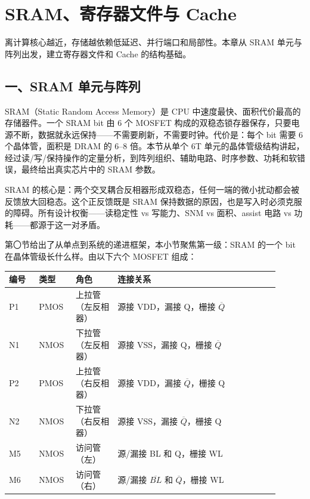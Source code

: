 \chapter{SRAM、寄存器文件与 Cache}

\begin{keyidea}
离计算核心越近，存储越依赖低延迟、并行端口和局部性。本章从 SRAM 单元与阵列出发，建立寄存器文件和 Cache 的结构基础。
\end{keyidea}

\section{一、SRAM 单元与阵列}

SRAM（Static Random Access Memory）是 CPU 中速度最快、面积代价最高的存储器件。一个 SRAM bit 由 6 个 MOSFET 构成的双稳态锁存器保存，只要电源不断，数据就永远保持——不需要刷新，不需要时钟。代价是：每个 bit 需要 6 个晶体管，面积是 DRAM 的 6--8 倍。本节从单个 6T 单元的晶体管级结构讲起，经过读/写/保持操作的定量分析，到阵列组织、辅助电路、时序参数、功耗和软错误，最终给出真实芯片中的 SRAM 参数。

\begin{keyidea}
SRAM 的核心是：两个交叉耦合反相器形成双稳态，任何一端的微小扰动都会被反馈放大回稳态。这个正反馈既是 SRAM 保持数据的原因，也是写入时必须克服的障碍。所有设计权衡——读稳定性 vs 写能力、SNM vs 面积、assist 电路 vs 功耗——都源于这一对矛盾。
\end{keyidea}


第〇节给出了从单点到系统的递进框架，本小节聚焦第一级：SRAM 的一个 bit 在晶体管级长什么样。由以下六个 MOSFET 组成：

\begin{longtable}{L{0.10\linewidth}L{0.12\linewidth}L{0.14\linewidth}L{0.54\linewidth}}
\toprule
编号 & 类型 & 角色 & 连接关系 \\
\midrule
P1 & PMOS & 上拉管（左反相器） & 源接 VDD，漏接 Q，栅接 $\overline{Q}$ \\\tablerowrule
N1 & NMOS & 下拉管（左反相器） & 源接 VSS，漏接 Q，栅接 $\overline{Q}$ \\\tablerowrule
P2 & PMOS & 上拉管（右反相器） & 源接 VDD，漏接 $\overline{Q}$，栅接 Q \\\tablerowrule
N2 & NMOS & 下拉管（右反相器） & 源接 VSS，漏接 $\overline{Q}$，栅接 Q \\\tablerowrule
M5 & NMOS & 访问管（左） & 源/漏接 BL 和 Q，栅接 WL \\\tablerowrule
M6 & NMOS & 访问管（右） & 源/漏接 $\overline{BL}$ 和 $\overline{Q}$，栅接 WL \\
\bottomrule
\end{longtable}

